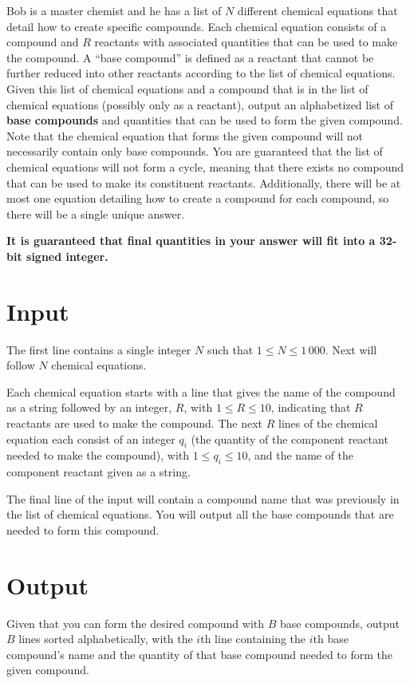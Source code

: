
Bob is a master chemist and he has a list of $N$ different chemical equations that detail how to
create specific compounds. Each chemical equation consists of a compound and $R$ reactants with
associated quantities that can be used to make the compound. A ``base compound'' is defined as a reactant
that cannot be further reduced into other reactants according to the list of chemical equations.
Given this list of chemical equations and a compound that is in the list of chemical equations
(possibly only as a reactant), output an alphabetized list of \textbf{base compounds} and quantities that
can be used to form the given compound. Note that the chemical equation that forms the given 
compound will not necessarily contain only base compounds. You are guaranteed that the list of chemical
equations will not form a cycle, meaning that there exists no compound that can be used to make its
constituent reactants. Additionally, there will be at most one equation detailing how to create a
compound for each compound, so there will be a single unique answer.

\textbf{It is guaranteed that final quantities in your answer will fit into a 32-bit signed integer.}

\section*{Input}
The first line contains a single integer $N$ such that $1 \leq N \leq 1\,000$.
Next will follow $N$ chemical equations. 

Each chemical equation starts with a line that gives the name of the compound as a string followed
by an integer, $R$, with $1 \leq R \leq 10$, indicating that $R$ reactants are used to make the compound.
The next $R$ lines of the chemical equation each consist of an integer $q_i$ (the quantity of
the component reactant needed to make the compound), with $1 \leq q_i \leq 10$, and the name of the
component reactant given as a string.

The final line of the input will contain a compound name that was previously in the list of chemical
equations. You will output all the base compounds that are needed to form this compound.

\section*{Output}
Given that you can form the desired compound with $B$ base compounds, output $B$ lines
sorted alphabetically, with the $i$th line containing the $i$th base compound's name and the quantity of
that base compound needed to form the given compound.
